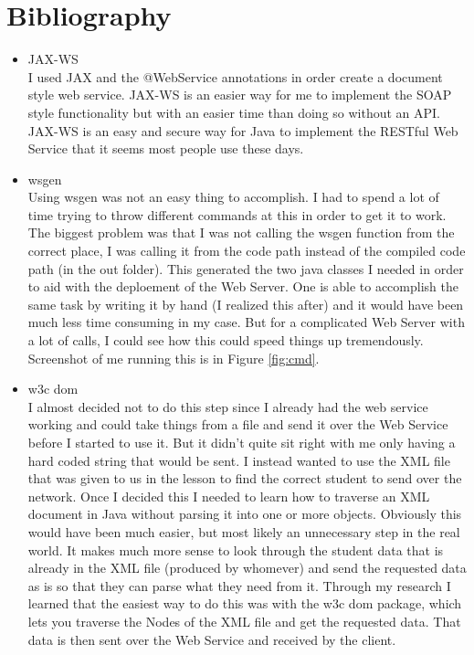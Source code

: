 \documentclass [a4paper,12pt,oneside,final,titlepage]{article}
\begin{document}
	\section{Bibliography}


	\begin{itemize}
	\item JAX-WS \\
	I used JAX and the @WebService annotations in order create a document style web service. JAX-WS is an easier way for me to implement the SOAP style functionality but with an easier time than doing so without an API. JAX-WS is an easy and secure way for Java to implement the RESTful Web Service that it seems most people use these days.
	\item wsgen \\
	Using wsgen was not an easy thing to accomplish. I had to spend a lot of time trying to throw different commands at this in order to get it to work. The biggest problem was that I was not calling the wsgen function from the correct place, I was calling it from the code path instead of the compiled code path (in the out folder). This generated the two java classes I needed in order to aid with the deploement of the Web Server. One is able to accomplish the same task by writing it by hand (I realized this after) and it would have been much less time consuming in my case. But for a complicated Web Server with a lot of calls, I could see how this could speed things up tremendously. Screenshot of me running this is in Figure \ref{fig:cmd}.

	
	\vspace{5mm}

	\item w3c dom \\
	I almost decided not to do this step since I already had the web service working and could take things from a file and send it over the Web Service before I started to use it. But it didn't quite sit right with me only having a hard coded string that would be sent. I instead wanted to use the XML file that was given to us in the lesson to find the correct student to send over the network. Once I decided this I needed to learn how to traverse an XML document in Java without parsing it into one or more objects. Obviously this would have been much easier, but most likely an unnecessary step in the real world. It makes much more sense to look through the student data that is already in the XML file (produced by whomever) and send the requested data as is so that they can parse what they need from it. Through my research I learned that the easiest way to do this was with the w3c dom package, which lets you traverse the Nodes of the XML file and get the requested data. That data is then sent over the Web Service and received by the client.
	\end{itemize}


	
	
\end{document}
